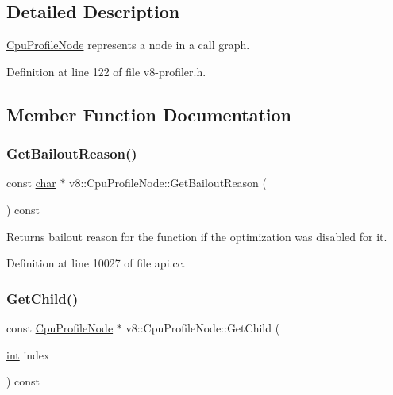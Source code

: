 \subsection{Detailed Description}
\mbox{\hyperlink{classv8_1_1CpuProfileNode}{Cpu\+Profile\+Node}} represents a node in a call graph. 

Definition at line 122 of file v8-\/profiler.\+h.



\subsection{Member Function Documentation}
\mbox{\label{classv8_1_1CpuProfileNode_ae96d7fad83e59fa09600f798bd559412}} 
\subsubsection{\texorpdfstring{Get\+Bailout\+Reason()}{GetBailoutReason()}}
{\footnotesize\ttfamily const \mbox{\hyperlink{classchar}{char}} $\ast$ v8\+::\+Cpu\+Profile\+Node\+::\+Get\+Bailout\+Reason (\begin{DoxyParamCaption}{ }\end{DoxyParamCaption}) const}

Returns bailout reason for the function if the optimization was disabled for it. 

Definition at line 10027 of file api.\+cc.

\mbox{\label{classv8_1_1CpuProfileNode_a3564b60d16ee61b1ab71ce179a2f6e92}} 
\subsubsection{\texorpdfstring{Get\+Child()}{GetChild()}}
{\footnotesize\ttfamily const \mbox{\hyperlink{classv8_1_1CpuProfileNode}{Cpu\+Profile\+Node}} $\ast$ v8\+::\+Cpu\+Profile\+Node\+::\+Get\+Child (\begin{DoxyParamCaption}\item[{\mbox{\hyperlink{classint}{int}}}]{index }\end{DoxyParamCaption}) const}

